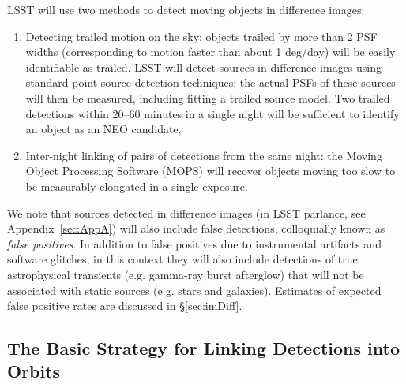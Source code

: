 LSST will use two methods to detect moving objects in difference images:
\begin{enumerate}
\item Detecting trailed motion on the sky: objects trailed by more
  than 2 PSF widths (corresponding to motion faster than about 1
  deg/day) will be easily identifiable as trailed. LSST will detect sources in 
  difference images using standard point-source detection techniques; the actual
  PSFs of these sources will then be measured, including fitting a trailed source model.   
  Two trailed detections within 20--60 minutes in a single night will be
  sufficient to identify an object as an NEO candidate,
\item Inter-night linking of pairs of detections from the same night: the Moving Object 
Processing Software (MOPS) will recover objects moving too slow to be measurably elongated in a single exposure.
\end{enumerate}

We note that sources detected in difference images (\DIASources in LSST parlance, see Appendix~\ref{sec:AppA})
will also include false detections, colloquially known as {\it false positives}.
In addition to false positives due to instrumental artifacts and software glitches,
in this context they will also include detections of true astrophysical transients
(e.g. gamma-ray burst afterglow) that will not be associated with static sources
(e.g. stars and galaxies). Estimates of expected false positive rates are discussed
in \S\ref{sec:imDiff}.



\subsection{The Basic Strategy for Linking Detections into Orbits}

